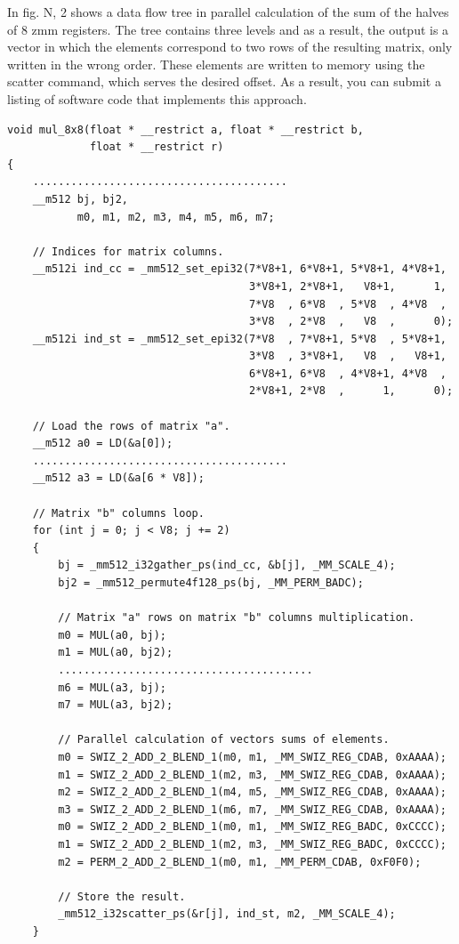 \documentclass[
11pt,%
tightenlines,%
twoside,%
onecolumn,%
nofloats,%
nobibnotes,%
nofootinbib,%
superscriptaddress,%
noshowpacs,%
centertags]%
{revtex4}
\begin{document}
In fig. N, 2 shows a data flow tree in parallel calculation of the sum of the halves of 8 zmm registers. The tree contains three levels and as a result, the output is a vector in which the elements correspond to two rows of the resulting matrix, only written in the wrong order. These elements are written to memory using the scatter command, which serves the desired offset. As a result, you can submit a listing of software code that implements this approach.

\begin{lstlisting}
void mul_8x8(float * __restrict a, float * __restrict b,
             float * __restrict r)
{
    ........................................
    __m512 bj, bj2,
           m0, m1, m2, m3, m4, m5, m6, m7;

    // Indices for matrix columns.
    __m512i ind_cc = _mm512_set_epi32(7*V8+1, 6*V8+1, 5*V8+1, 4*V8+1,
                                      3*V8+1, 2*V8+1,   V8+1,      1,
                                      7*V8  , 6*V8  , 5*V8  , 4*V8  ,
                                      3*V8  , 2*V8  ,   V8  ,      0);
    __m512i ind_st = _mm512_set_epi32(7*V8  , 7*V8+1, 5*V8  , 5*V8+1,
                                      3*V8  , 3*V8+1,   V8  ,   V8+1,
                                      6*V8+1, 6*V8  , 4*V8+1, 4*V8  ,
                                      2*V8+1, 2*V8  ,      1,      0);

    // Load the rows of matrix "a".
    __m512 a0 = LD(&a[0]);
    ........................................
    __m512 a3 = LD(&a[6 * V8]);

    // Matrix "b" columns loop.
    for (int j = 0; j < V8; j += 2)
    {
        bj = _mm512_i32gather_ps(ind_cc, &b[j], _MM_SCALE_4);
        bj2 = _mm512_permute4f128_ps(bj, _MM_PERM_BADC);

        // Matrix "a" rows on matrix "b" columns multiplication.
        m0 = MUL(a0, bj);
        m1 = MUL(a0, bj2);
        ........................................
        m6 = MUL(a3, bj);
        m7 = MUL(a3, bj2);

        // Parallel calculation of vectors sums of elements.
        m0 = SWIZ_2_ADD_2_BLEND_1(m0, m1, _MM_SWIZ_REG_CDAB, 0xAAAA);
        m1 = SWIZ_2_ADD_2_BLEND_1(m2, m3, _MM_SWIZ_REG_CDAB, 0xAAAA);
        m2 = SWIZ_2_ADD_2_BLEND_1(m4, m5, _MM_SWIZ_REG_CDAB, 0xAAAA);
        m3 = SWIZ_2_ADD_2_BLEND_1(m6, m7, _MM_SWIZ_REG_CDAB, 0xAAAA);
        m0 = SWIZ_2_ADD_2_BLEND_1(m0, m1, _MM_SWIZ_REG_BADC, 0xCCCC);
        m1 = SWIZ_2_ADD_2_BLEND_1(m2, m3, _MM_SWIZ_REG_BADC, 0xCCCC);
        m2 = PERM_2_ADD_2_BLEND_1(m0, m1, _MM_PERM_CDAB, 0xF0F0);

        // Store the result.
        _mm512_i32scatter_ps(&r[j], ind_st, m2, _MM_SCALE_4);
    }
\end{lstlisting}
\end{document}
